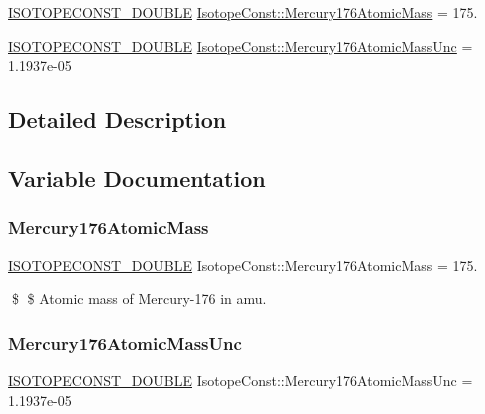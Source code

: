 \begin{DoxyCompactItemize}
\item 
\mbox{\hyperlink{group___isotope_const-_macros_ga8f45a7272ce02c0b4c65c44636ed719a}{I\+S\+O\+T\+O\+P\+E\+C\+O\+N\+S\+T\+\_\+\+D\+O\+U\+B\+LE}} \mbox{\hyperlink{group___isotope_const-_mercury-_hg176_gacc0450ada731a6045a37a2abe3044839}{Isotope\+Const\+::\+Mercury176\+Atomic\+Mass}} = 175.
\item 
\mbox{\hyperlink{group___isotope_const-_macros_ga8f45a7272ce02c0b4c65c44636ed719a}{I\+S\+O\+T\+O\+P\+E\+C\+O\+N\+S\+T\+\_\+\+D\+O\+U\+B\+LE}} \mbox{\hyperlink{group___isotope_const-_mercury-_hg176_ga5d23fe25e3b57c4a5058296ec7fcd093}{Isotope\+Const\+::\+Mercury176\+Atomic\+Mass\+Unc}} = 1.\+1937e-\/05
\end{DoxyCompactItemize}


\subsection{Detailed Description}


\subsection{Variable Documentation}
\mbox{\label{group___isotope_const-_mercury-_hg176_gacc0450ada731a6045a37a2abe3044839}} 
\subsubsection{\texorpdfstring{Mercury176\+Atomic\+Mass}{Mercury176AtomicMass}}
{\footnotesize\ttfamily \mbox{\hyperlink{group___isotope_const-_macros_ga8f45a7272ce02c0b4c65c44636ed719a}{I\+S\+O\+T\+O\+P\+E\+C\+O\+N\+S\+T\+\_\+\+D\+O\+U\+B\+LE}} Isotope\+Const\+::\+Mercury176\+Atomic\+Mass = 175.}

\$ \$ Atomic mass of Mercury-\/176 in amu. \mbox{\label{group___isotope_const-_mercury-_hg176_ga5d23fe25e3b57c4a5058296ec7fcd093}} 
\subsubsection{\texorpdfstring{Mercury176\+Atomic\+Mass\+Unc}{Mercury176AtomicMassUnc}}
{\footnotesize\ttfamily \mbox{\hyperlink{group___isotope_const-_macros_ga8f45a7272ce02c0b4c65c44636ed719a}{I\+S\+O\+T\+O\+P\+E\+C\+O\+N\+S\+T\+\_\+\+D\+O\+U\+B\+LE}} Isotope\+Const\+::\+Mercury176\+Atomic\+Mass\+Unc = 1.\+1937e-\/05}

